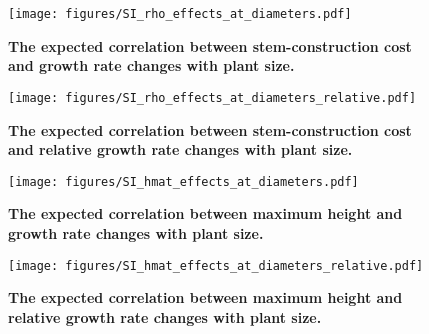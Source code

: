 \documentclass[12pt, a4paper]{article}
\makeatletter
\def\maxwidth{\ifdim\Gin@nat@width>\linewidth\linewidth
\else\Gin@nat@width\fi}
\let\Oldincludegraphics\includegraphics
\renewcommand{\includegraphics}[1]{\Oldincludegraphics[width=\maxwidth]{#1}}
\makeatother
\begin{document}
\begin{appendices}
\begin{figure}[ht]
\centering
\texttt{[image: figures/SI\_rho\_effects\_at\_diameters.pdf]}
\caption{\textbf{The expected correlation between stem-construction cost
and growth rate changes with plant size.} \label{f-rho_growth_size}}
\end{figure}

\begin{figure}[ht]
\centering
\texttt{[image: figures/SI\_rho\_effects\_at\_diameters\_relative.pdf]}
\caption{\textbf{The expected correlation between stem-construction cost
and relative growth rate changes with plant size.}
\label{f-rho_growth_size_relative}}
\end{figure}

\begin{figure}[ht]
\centering
\texttt{[image: figures/SI\_hmat\_effects\_at\_diameters.pdf]}
\caption{\textbf{The expected correlation between maximum height and
growth rate changes with plant size.} \label{f-hmat_growth_size}}
\end{figure}

\begin{figure}[ht]
\centering
\texttt{[image: figures/SI\_hmat\_effects\_at\_diameters\_relative.pdf]}
\caption{\textbf{The expected correlation between maximum height and
relative growth rate changes with plant size.}
\label{f-hmat_growth_size_relative}}
\end{figure}


\end{appendices}
\end{document}
